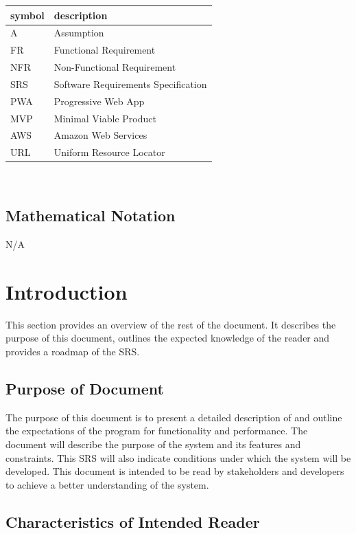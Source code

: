 \documentclass[12pt]{article}
\begin{document}
\renewcommand{\arraystretch}{1.2}
\begin{tabular}{l l} 
  \toprule		
  \textbf{symbol} & \textbf{description}\\
  \midrule 
  A & Assumption\\
  FR & Functional Requirement\\
  NFR & Non-Functional Requirement\\
  SRS & Software Requirements Specification\\
  PWA & Progressive Web App\\
  MVP & Minimal Viable Product\\
  AWS & Amazon Web Services\\
  URL & Uniform Resource Locator\\
  \bottomrule
\end{tabular}\\
\subsection{Mathematical Notation}

N/A

\newpage


\section{Introduction}

This section provides an overview of the rest of the document. It describes the purpose of this document, outlines the expected knowledge of the reader and provides a roadmap of the SRS.

\subsection{Purpose of Document}

  The purpose of this document is to present a detailed description of \progname{} and outline the expectations of the program for functionality and performance. The document will describe the purpose of the system and its features and constraints. This SRS will also indicate conditions under which the system will be developed. This document is intended to be read by stakeholders and developers to achieve a better understanding of the system.

\subsection{Characteristics of Intended Reader} \label{sec_IntendedReader}
\end{document}
